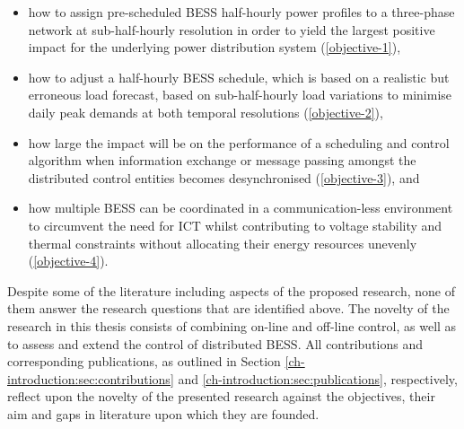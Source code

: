 \begin{itemize}
	\item how to assign pre-scheduled BESS half-hourly power profiles to a three-phase network at sub-half-hourly resolution in order to yield the largest positive impact for the underlying power distribution system (\ref{objective-1}),
	\item how to adjust a half-hourly BESS schedule, which is based on a realistic but erroneous load forecast, based on sub-half-hourly load variations to minimise daily peak demands at both temporal resolutions (\ref{objective-2}),
	\item how large the impact will be on the performance of a scheduling and control algorithm when information exchange or message passing amongst the distributed control entities becomes desynchronised (\ref{objective-3}), and
	\item how multiple BESS can be coordinated in a communication-less environment to circumvent the need for ICT whilst contributing to voltage stability and thermal constraints without allocating their energy resources unevenly (\ref{objective-4}).
\end{itemize}

Despite some of the literature including aspects of the proposed research, none of them answer the research questions that are identified above.
The novelty of the research in this thesis consists of combining on-line and off-line control, as well as to assess and extend the control of distributed BESS.
All contributions and corresponding publications, as outlined in Section \ref{ch-introduction:sec:contributions} and \ref{ch-introduction:sec:publications}, respectively, reflect upon the novelty of the presented research against the objectives, their aim and gaps in literature upon which they are founded.
